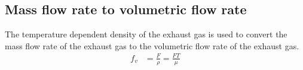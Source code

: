 \subsection{Mass flow rate to volumetric flow rate}
The temperature dependent density of the exhaust gas is used to convert the mass
flow rate of the exhaust gas to the volumetric flow rate of the exhaust gas.
\begin{align*}
    f_v &= \frac{F}{\rho} = \frac{FT}{\mu}
\end{align*}
